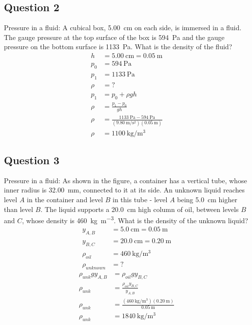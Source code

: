 \documentclass{article}
\begin{document}
\subsection{Question 2}

Pressure in a fluid: A cubical box, \SI{5.00}{\centi \meter} on each side, is immersed in a fluid. The gauge pressure at the top surface of the box is \SI{594}{\pascal} and the gauge pressure on the bottom surface is \SI{1133}{\pascal}. What is the density of the fluid?
\begin{align*}
	h & = \SI{5.00}{\centi \meter} = \SI{0.05}{\meter} \\
	p_0 & = \SI{594}{\pascal} \\
	p_1 & = \SI{1133}{\pascal} \\
	\rho & = ?
\end{align*}
\begin{align*}
	p_1 & = p_0 + \rho gh \\
	\rho & = \frac{ p_1 - p_0 }{ gh } \\
	\rho & = \frac{ \SI{1133}{\pascal} - \SI{594}{\pascal} }{ (\SI{9.80}{\meter \per \second \squared})(\SI{0.05}{\meter}) } \\
	\rho & = \SI{1100}{\kilogram \per \meter \cubed}
\end{align*}

\subsection{Question 3}

Pressure in a fluid: As shown in the figure, a container has a vertical tube, whose inner radius is \SI{32.00}{\milli \meter}, connected to it at its side. An unknown liquid reaches level $ A $ in the container and level $ B $ in this tube - level $ A $ being \SI{5.0}{\centi \meter} higher than level $ B $. The liquid supports a \SI{20.0}{\centi \meter} high column of oil, between levels $ B $ and $ C $, whose density is \SI{460}{\kilogram \per \meter \cubed}. What is the density of the unknown liquid?
\begin{align*}
	y_{A,B} & = \SI{5.0}{\centi \meter} = \SI{0.05}{\meter} \\
	y_{B,C} & = \SI{20.0}{\centi \meter} = \SI{0.20}{\meter} \\
	\rho_{oil} & = \SI{460}{\kilogram \per \meter \cubed} \\
	\rho_{unknown} & = ?
\end{align*}
\begin{align*}
	\rho_{unk}gy_{A,B} & = \rho_{oil}gy_{B,C} \\
	\rho_{unk} & = \frac{ \rho_{oil}y_{B,C} }{ y_{A,B} } \\
	\rho_{unk} & = \frac{ (\SI{460}{\kilogram \per \meter \cubed})(\SI{0.20}{\meter}) }{ \SI{0.05}{\meter} } \\
	\rho_{unk} & = \SI{1840}{\kilogram \per \meter \cubed}
\end{align*}
\end{document}
